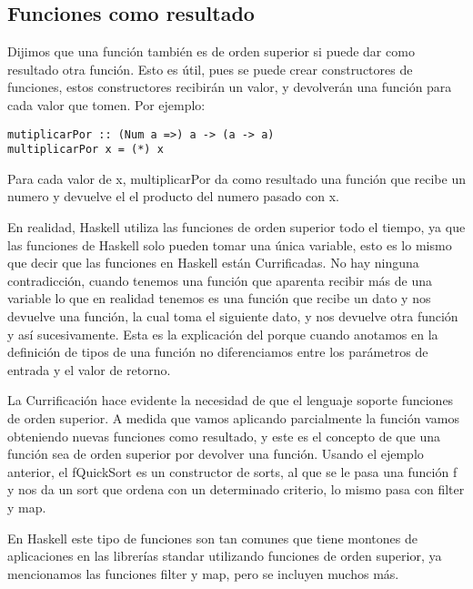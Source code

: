 \subsection{Funciones como resultado} %
\label{sub:funciones_como_resultado}

Dijimos que una función también es de orden superior si puede dar como resultado otra función. Esto es útil, pues se puede crear constructores de funciones, estos constructores recibirán un valor, y devolverán una función para cada valor que tomen. Por ejemplo:

\begin{lstlisting}
mutiplicarPor :: (Num a =>) a -> (a -> a)
multiplicarPor x = (*) x
\end{lstlisting}

Para cada valor de x, multiplicarPor da como resultado una función que recibe un numero y devuelve el el producto del numero pasado con x.



En realidad, Haskell utiliza las funciones de orden superior todo el tiempo, ya que las funciones de Haskell solo pueden tomar una única variable, esto es lo mismo que decir que las funciones en Haskell están Currificadas. No hay ninguna contradicción, cuando tenemos una función que aparenta recibir más de una variable lo que en realidad tenemos es una función que recibe un dato y nos devuelve una función, la cual toma el siguiente dato, y nos devuelve otra función y así sucesivamente. Esta es la explicación del porque cuando anotamos en la definición de tipos de una función no diferenciamos entre los parámetros de entrada y el valor de retorno.

La Currificación hace evidente la necesidad de que el lenguaje soporte funciones de orden superior. A medida que vamos aplicando parcialmente la función vamos obteniendo nuevas funciones como resultado, y este es el concepto de que una función sea de orden superior por devolver una función. Usando el ejemplo anterior, el fQuickSort es un constructor de sorts, al que se le pasa una función f y nos da un sort que ordena con un determinado criterio, lo mismo pasa con filter y map.

En Haskell este tipo de funciones son tan comunes que tiene montones de aplicaciones en las librerías standar utilizando funciones de orden superior, ya mencionamos las funciones  filter y map, pero se incluyen muchos más.


